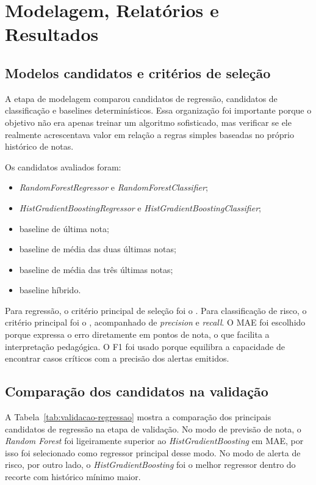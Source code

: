 \chapter{Modelagem, Relat\'orios e Resultados}
\label{cap:resultados}

\section{Modelos candidatos e crit\'erios de sele\c{c}\~ao}
\label{sec:candidatos}

A etapa de modelagem comparou candidatos de regress\~ao, candidatos de classifica\c{c}\~ao e baselines determin\'isticos. Essa organiza\c{c}\~ao foi importante porque o objetivo n\~ao era apenas treinar um algoritmo sofisticado, mas verificar se ele realmente acrescentava valor em rela\c{c}\~ao a regras simples baseadas no pr\'oprio hist\'orico de notas.

Os candidatos avaliados foram:

\begin{itemize}
    \item \textit{RandomForestRegressor} e \textit{RandomForestClassifier};
    \item \textit{HistGradientBoostingRegressor} e \textit{HistGradientBoostingClassifier};
    \item baseline de \'ultima nota;
    \item baseline de m\'edia das duas \'ultimas notas;
    \item baseline de m\'edia das tr\^es \'ultimas notas;
    \item baseline h\'ibrido.
\end{itemize}

Para regress\~ao, o crit\'erio principal de sele\c{c}\~ao foi o . Para classifica\c{c}\~ao de risco, o crit\'erio principal foi o , acompanhado de \textit{precision} e \textit{recall}. O MAE foi escolhido porque expressa o erro diretamente em pontos de nota, o que facilita a interpreta\c{c}\~ao pedag\'ogica. O F1 foi usado porque equilibra a capacidade de encontrar casos cr\'iticos com a precis\~ao dos alertas emitidos.

\section{Compara\c{c}\~ao dos candidatos na valida\c{c}\~ao}
\label{sec:comparacao-candidatos}

A Tabela~\ref{tab:validacao-regressao} mostra a compara\c{c}\~ao dos principais candidatos de regress\~ao na etapa de valida\c{c}\~ao. No modo de previs\~ao de nota, o \textit{Random Forest} foi ligeiramente superior ao \textit{HistGradientBoosting} em MAE, por isso foi selecionado como regressor principal desse modo. No modo de alerta de risco, por outro lado, o \textit{HistGradientBoosting} foi o melhor regressor dentro do recorte com hist\'orico m\'inimo maior.

